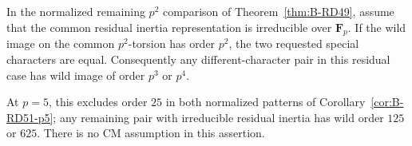 \begin{proposition}
\label{prop:B-RD55-minimal-wild}
In the normalized remaining $p^2$ comparison of
Theorem~\ref{thm:B-RD49}, assume that the common residual
inertia representation is irreducible over $\mathbf F_p$.
If the wild image on the common $p^2$-torsion has order $p^2$,
the two requested special characters are equal.
Consequently any different-character pair in this residual
case has wild image of order $p^3$ or $p^4$.

At $p=5$, this excludes order $25$ in both normalized patterns
of Corollary~\ref{cor:B-RD51-p5}; any remaining pair with
irreducible residual inertia has wild order $125$ or $625$.
There is no CM assumption in this assertion.
\end{proposition}
